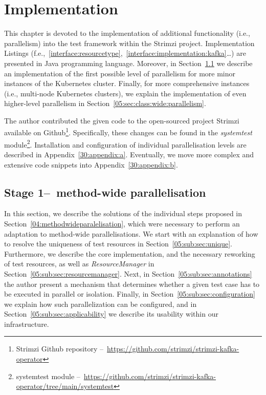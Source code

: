 \chapter{Implementation}
\label{05:chapter:title}

This chapter is devoted to the implementation of additional functionality (i.e., parallelism) into the test framework within the Strimzi project.
Implementation Listings (f.e.,~\ref{interface:resourcetype},~\ref{interface:implementation:kafka}\dots) are presented in Java programming language.
Moreover, in Section~\ref{05:sec:method:wide:parallelism} we describe an implementation of the first possible level of
parallelism for more minor instances of the Kubernetes cluster.
Finally, for more comprehensive instances (i.e., multi-node Kubernetes clusters),
we explain the implementation of even higher-level parallelism in Section~\ref{05:sec:class:wide:parallelism}.

The author contributed the given code to the open-sourced project Strimzi available on
Github\footnote{Strimzi Github repository \---\ \url{https://github.com/strimzi/strimzi-kafka-operator}}.
Specifically, these changes can be found in the \emph{systemtest} module\footnote{systemtest module \---\ \url{https://github.com/strimzi/strimzi-kafka-operator/tree/main/systemtest}}.
Installation and configuration of individual parallelisation levels are described in Appendix~\ref{30:appendix:a}.
Eventually, we move more complex and extensive code snippets into Appendix~\ref{30:appendix:b}.

\section{Stage 1\---\ method-wide parallelisation}
\label{05:sec:method:wide:parallelism}

In this section, we describe the solutions of the individual steps proposed in Section~\ref{04:methodwideparalelisation},
which were necessary to perform an adaptation to method-wide parallelisations.
We start with an explanation of how to resolve the uniqueness of test resources in Section~\ref{05:sub:sec:unique}.
Furthermore, we describe the core implementation, and the necessary reworking of test resources, as well as \emph{ResourceManager} in Section~\ref{05:sub:sec:resourcemanager}.
Next, in Section~\ref{05:sub:sec:annotations} the author present a mechanism that determines whether a given test case has to be executed in parallel or isolation.
Finally, in Section~\ref{05:sub:sec:configuration} we explain how such parallelization can be configured,
and in Section~\ref{05:sub:sec:applicability} we describe its usability within our infrastructure.

